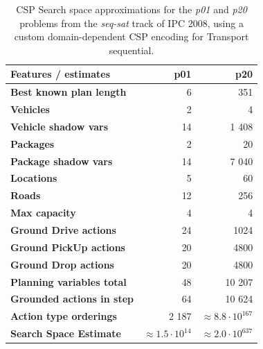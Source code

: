 

\begin{table}[tb]
\begin{center}
\begin{tabular}{l||rr}
\textbf{Features / estimates} & \textbf{p01} & \textbf{p20} \\ 
\hline 
\hline 
\textbf{Best known plan length} & 6 & 351 \\ 
\textbf{Vehicles} & 2 & 4 \\ 
\textbf{Vehicle shadow vars} & 14 & 1 408 \\
\textbf{Packages} & 2 & 20 \\ 
\textbf{Package shadow vars} & 14 & 7 040 \\
\textbf{Locations} & 5 & 60 \\ 
\textbf{Roads} & 12 & 256 \\
\textbf{Max capacity} & 4 & 4 \\ 
\hline
\textbf{Ground Drive actions} & 24 & 1024 \\ 
\textbf{Ground PickUp actions} & 20 & 4800 \\ 
\textbf{Ground Drop actions} & 20 & 4800 \\ 
\hline 
\textbf{Planning variables total} & 48 & 10 207 \\ 
\textbf{Grounded actions in step} & 64 & 10 624 \\ 
\textbf{Action type orderings} & 2 187 & $\approx 8.8 \cdot 10^{167}$ \\ 
\textbf{Search Space Estimate} & $\approx 1.5 \cdot 10^{14}$ & $\approx 2.0 \cdot 10^{637}$ \\
\end{tabular}
\end{center}
\caption[Search space approximations for a domain-dependent CSP encoding.]{CSP Search space approximations for the \textit{p01} and \textit{p20} problems from the \textit{seq-sat} track of IPC 2008, using a custom domain-dependent CSP encoding for Transport sequential.}
\label{tab:csp-custom}
\end{table}

